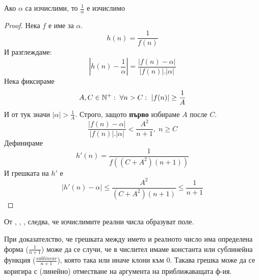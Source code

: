 \begin{lemma}\label{lem:div-computable}
    Ако $\alpha$ са изчислими, то $\frac{1}{\alpha}$ е изчислимо
\end{lemma}
\begin{proof}
    Нека $f$ е име за $\alpha$.
    \begin{equation*}
        h(n) = \frac{1}{f(n)}
    \end{equation*}
    И разглеждаме:
    \begin{equation*}
        |h(n) - \frac{1}{\alpha}| = \frac{|f(n) - \alpha|}{|f(n)|.|\alpha|}
    \end{equation*}
    Нека фиксираме 
    \begin{equation*}
        A, C \in {\mathbb{N}}^+:\; \forall n > C:\ |f(n)| \geq \frac{1}{A}
    \end{equation*}
    И от тук значи $|\alpha| > \frac{1}{A}$. Строго, защото \textbf{първо} избираме $A$ после $C$.
    \begin{equation*}
        \frac{|f(n) - \alpha|}{|f(n)|.|\alpha|} < \frac{A^2}{n+1},\; n \geq C
    \end{equation*}
    Дефинираме 
    \begin{equation*}
        h'(n) = \frac{1}{f\left((C+A^2)(n+1)\right)}
    \end{equation*}
    И грешката на $h'$ е
    \begin{equation*}
        |h'(n) - \alpha| \leq \frac{A^2}{(C+A^2)(n+1)} \leq \frac{1}{n+1}
    \end{equation*}
\end{proof}

\begin{corollary}
    От , , ,  следва, че изчислимите реални числа образуват поле.
\end{corollary}
\begin{remark}
    При доказателство, че грешката между името и реалното число има определена форма ($\frac{1}{n+1}$) може да се случи, че в числител имаме константа или сублинейна функция ($\frac{sublinear}{n+1}$), която така или иначе клони към 0. Такава грешка може да се коригира с (линейно) отместване на аргумента на приближаващата ф-ия. 
\end{remark}
